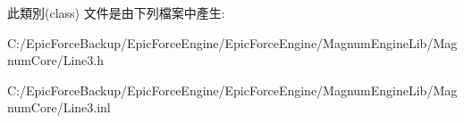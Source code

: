 此類別(class) 文件是由下列檔案中產生\+:\begin{DoxyCompactItemize}
\item 
C\+:/\+Epic\+Force\+Backup/\+Epic\+Force\+Engine/\+Epic\+Force\+Engine/\+Magnum\+Engine\+Lib/\+Magnum\+Core/Line3.\+h\item 
C\+:/\+Epic\+Force\+Backup/\+Epic\+Force\+Engine/\+Epic\+Force\+Engine/\+Magnum\+Engine\+Lib/\+Magnum\+Core/Line3.\+inl\end{DoxyCompactItemize}
